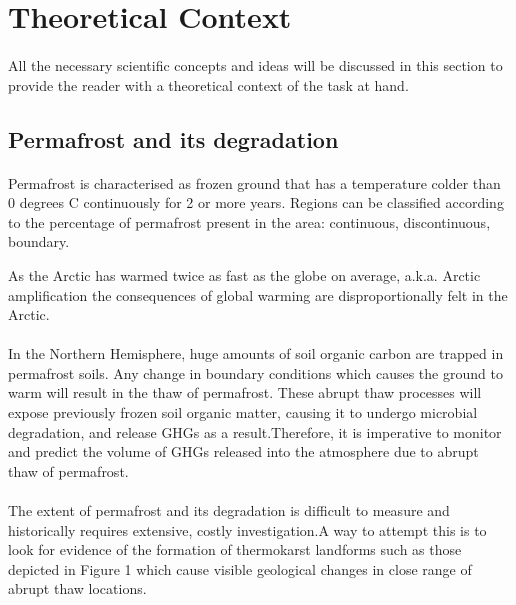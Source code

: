 \documentclass{article}
\begin{document}
\section{Theoretical Context}
\paragraph{}
All the necessary scientific concepts and ideas will be discussed in this section to provide the reader with a theoretical context of the task at hand.

\subsection{Permafrost and its degradation}
\paragraph{}
Permafrost is characterised as frozen ground that has a temperature colder than 0 degrees C continuously for 2 or more years. Regions can be classified according to the percentage of permafrost present in the area: continuous, discontinuous, boundary. 

As the Arctic has warmed twice as fast as the globe on average, a.k.a. Arctic amplification \cite{climatechangefur} the consequences of global warming are disproportionally felt in the Arctic. 

\paragraph{}
In the Northern Hemisphere, huge amounts of soil organic carbon are trapped in permafrost soils. Any change in boundary conditions which causes the ground to warm will result in the thaw of permafrost. These abrupt thaw processes will expose previously frozen soil organic matter, causing it to undergo microbial degradation, and release GHGs as a result.Therefore, it is imperative to monitor and predict the volume of GHGs released into the atmosphere due to abrupt thaw of permafrost.

\paragraph{}
The extent of permafrost and its degradation is difficult to measure and historically requires extensive, costly investigation.A way to attempt this is to look for evidence of the formation of thermokarst landforms such as those depicted in Figure 1 which cause visible geological changes in close range of abrupt thaw locations.
\end{document}
